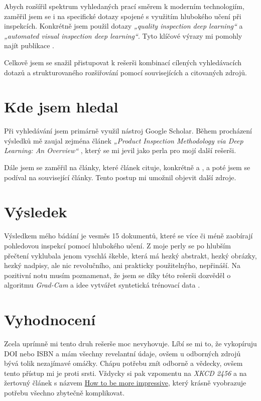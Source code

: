 \documentclass[FM,SP,localfonts]{tulthesis}
\begin{document}
Abych rozšířil spektrum vyhledaných prací směrem k moderním technologiím, zaměřil jsem se i na specifické dotazy spojené s využitím hlubokého učení při inspekcích. Konkrétně jsem použil dotazy \textit{„quality inspection deep learning“} a \textit{„automated visual inspection deep learning“}. Tyto klíčové výrazy mi pomohly najít publikace \parencite{Gutierrez2021, Huetten2024}.

Celkově jsem se snažil přistupovat k rešerši kombinací cílených vyhledávacích dotazů a strukturovaného rozšiřování pomocí  souvisejících a citovaných zdrojů.

\chapter{Kde jsem hledal}
Při vyhledávání jsem primárně využil nástroj Google Scholar. Během procházení výsledků mě zaujal zejména článek \textit{„Product Inspection Methodology via Deep Learning: An Overview“} \parencite{Kim2021}, který se mi jevil jako perla pro mojí další rešerši.

Dále jsem se zaměřil na články, které článek \parencite{Kim2021} cituje, konkrétně \parencite{Wei2018} a \parencite{Zhang2018}, a poté jsem se podíval na související články. Tento postup mi umožnil objevit další zdroje.

\chapter{Výsledek}
Výsledkem mého bádání je vesměs 15 dokumentů, které se více či méně zaobírají pohledovou inspekcí pomocí hlubokého učení. Z moje perly se po hlubším přečtení vyklubala jenom vyschlá škeble, která má hezký abstrakt, hezký obrázky, hezký nadpisy, ale nic revolučního, ani prakticky použitelnýho, nepřináší. Na pozitivní notu musím poznamenat, že jsem se díky této rešerši dozvěděl o algoritmu \textit{Grad-Cam} a idee vytvářet syntetická trénovací data \parencite{Gutierrez2021}.

\chapter{Vyhodnocení}
Zcela uprímně mi tento druh rešerše moc nevyhovuje. Líbí se mi to, že vykopíruju DOI nebo ISBN a mám všechny revelantní údaje, ovšem u odborných zdrojů bývá tolik nezajímavé omáčky. Chápu potřebu znít odborně a vědecky, ovšem tento přístup mi je proti srsti. Vždycky si pak vzpomentu na \textit{XKCD 2456} a na žertovný článek s názvem \href{https://agnd.net/valpo/340/impressive.html}{How to be more impressive}, který krásně vyobrazuje potřebu všechno zbytečně komplikovat.
\end{document}

